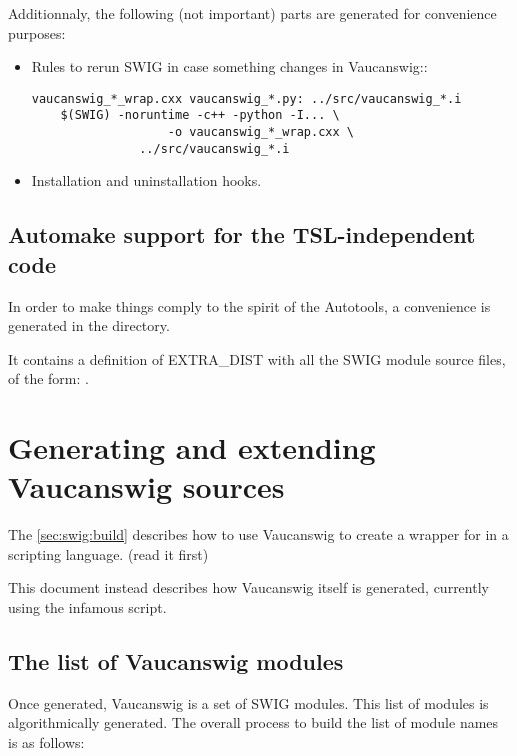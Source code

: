 Additionnaly, the following (not important) parts are generated for
convenience purposes:

\begin{itemize}
\item Rules to rerun SWIG in case something changes in Vaucanswig::
\begin{lstlisting}[language=Make]
vaucanswig_*_wrap.cxx vaucanswig_*.py: ../src/vaucanswig_*.i
	$(SWIG) -noruntime -c++ -python -I... \
	               -o vaucanswig_*_wrap.cxx \
		       ../src/vaucanswig_*.i
\end{lstlisting}%
                     
\item Installation and uninstallation hooks.
\end{itemize}


\subsection{Automake support for the TSL-independent code}

In order to make things comply to the spirit of the Autotools, a
convenience  is generated in the 
directory.

It contains a definition of EXTRA\_DIST with all the SWIG module
source files, of the form: .


\section{Generating and extending Vaucanswig sources}

The \autoref{sec:swig:build} describes how to use Vaucanswig to create
a wrapper for \Vauc in a scripting language.  (read it first)

This document instead describes how Vaucanswig itself is generated,
currently using the infamous  script.

\subsection{The list of Vaucanswig modules}

Once generated, Vaucanswig is a set of SWIG modules. This list of
modules is algorithmically generated. The overall process to build the
list of module names is as follows:

